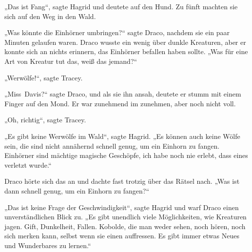 „Das ist Fang“, sagte Hagrid und deutete auf den Hund. Zu fünft machten sie sich auf den Weg in den Wald.

„Was könnte die Einhörner umbringen?“ sagte Draco, nachdem sie ein paar Minuten gelaufen waren. Draco wusste ein wenig über dunkle Kreaturen, aber er konnte sich an nichts erinnern, das Einhörner befallen haben sollte. „Was für eine Art von Kreatur tut das, weiß das jemand?“

„Werwölfe!“, sagte Tracey.

„Miss~Davis?“ sagte Draco, und als sie ihn ansah, deutete er stumm mit einem Finger auf den Mond. Er war zunehmend im zunehmen, aber noch nicht voll.

„Oh, richtig“, sagte Tracey.

„Es gibt keine Werwölfe im Wald“, sagte Hagrid. „Es können auch keine Wölfe sein, die sind nicht annähernd schnell genug, um ein Einhorn zu fangen. Einhörner sind mächtige magische Geschöpfe, ich habe noch nie erlebt, dass eines verletzt wurde.“

Draco hörte sich das an und dachte fast trotzig über das Rätsel nach. „Was ist dann schnell genug, um ein Einhorn zu fangen?“

„Das ist keine Frage der Geschwindigkeit“, sagte Hagrid und warf Draco einen unverständlichen Blick zu. „Es gibt unendlich viele Möglichkeiten, wie Kreaturen jagen. Gift, Dunkelheit, Fallen. Kobolde, die man weder sehen, noch hören, noch sich merken kann, selbst wenn sie einen auffressen. Es gibt immer etwas Neues und Wunderbares zu lernen.“

